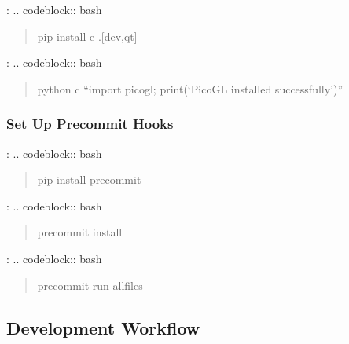 \documentclass[a4paper,10pt,english,openany,oneside]{sphinxmanual}
\begin{document}
\sphinxAtStartPar
{}:
.. code\sphinxhyphen{}block:: bash
\begin{quote}

\sphinxAtStartPar
pip install \sphinxhyphen{}e .{[}dev,qt{]}
\end{quote}

\sphinxAtStartPar
{}:
.. code\sphinxhyphen{}block:: bash
\begin{quote}

\sphinxAtStartPar
python \sphinxhyphen{}c “import picogl; print(‘PicoGL installed successfully’)”
\end{quote}


\subsubsection{Set Up Pre\sphinxhyphen{}commit Hooks}
\label{\detokenize{contributing:set-up-pre-commit-hooks}}
\sphinxAtStartPar
{}:
.. code\sphinxhyphen{}block:: bash
\begin{quote}

\sphinxAtStartPar
pip install pre\sphinxhyphen{}commit
\end{quote}

\sphinxAtStartPar
{}:
.. code\sphinxhyphen{}block:: bash
\begin{quote}

\sphinxAtStartPar
pre\sphinxhyphen{}commit install
\end{quote}

\sphinxAtStartPar
{}:
.. code\sphinxhyphen{}block:: bash
\begin{quote}

\sphinxAtStartPar
pre\sphinxhyphen{}commit run \textendash{}all\sphinxhyphen{}files
\end{quote}


\subsection{Development Workflow}
\label{\detokenize{contributing:development-workflow}}
\end{document}
